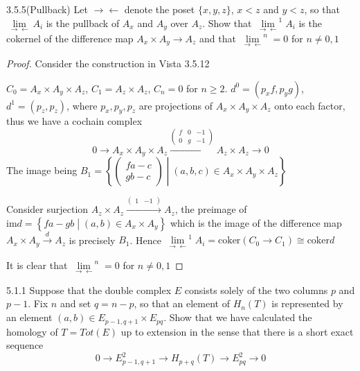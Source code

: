 \documentclass[../main.tex]{subfiles}
\begin{document}
\begin{customexercise}{3.5.5}(Pullback)
Let $\to\leftarrow$ denote the poset $\{x,y,z\}$, $x<z$ and $y<z$, so that $\displaystyle\underset{\to\leftarrow}{\lim}A_i$ is the pullback of $A_x$ and $A_y$ over $A_z$. Show that $\displaystyle\underset{\to\leftarrow}{\lim}^1A_i$ is the cokernel of the difference map $A_x\times A_y\to A_z$ and that $\displaystyle\underset{\to\leftarrow}{\lim}^n=0$ for $n\neq0,1$

\end{customexercise}

\begin{proof}
Consider the construction in Vista 3.5.12
\begin{center}
\end{center}
$C_0=A_x\times A_y\times A_z$, $C_1=A_z\times A_z$, $C_n=0$ for $n\geq2$. $d^0=(p_xf,p_yg)$, $d^1=(p_z,p_z)$, where $p_x,p_y,p_z$ are projections of $A_x\times A_y\times A_z$ onto each factor, thus we have a cochain complex
\[0\to A_x\times A_y\times A_z\xrightarrow{\begin{pmatrix}
f&0&-1 \\
0&g&-1
\end{pmatrix}}A_z\times A_z\to0\]
The image being $B_1=\left\{\begin{pmatrix}
fa-c \\
gb-c
\end{pmatrix}\middle|(a,b,c)\in A_x\times A_y\times A_z\right\}$ \par
Consider surjection $A_z\times A_z\xrightarrow{\begin{pmatrix}
1 &-1
\end{pmatrix}}A_z$, the preimage of $\mathrm{im}d=\left\{fa-gb\middle|(a,b)\in A_x\times A_y\right\}$ which is the image of the difference map $A_x\times A_y\xrightarrow dA_z$ is precisely $B_1$. Hence $\displaystyle\underset{\to\leftarrow}{\lim}^1A_i=\mathrm{coker}(C_0\to C_1)\cong\mathrm{coker}d$ \par
It is clear that $\displaystyle\underset{\to\leftarrow}{\lim}^n=0$ for $n\neq0,1$
\end{proof}

\begin{customexercise}{5.1.1}
Suppose that the double complex $E$ consists solely of the two columns $p$ and $p-1$. Fix $n$ and set $q=n-p$, so that an element of $H_n(T)$ is represented by an element $(a,b)\in E_{p-1,q+1}\times E_{pq}$. Show that we have calculated the homology of $T=Tot(E)$ up to extension in the sense that there is a short exact sequence
\[0\to E^2_{p-1,q+1}\to H_{p+q}(T)\to E^2_{pq}\to0\]
\end{customexercise}
\end{document}

